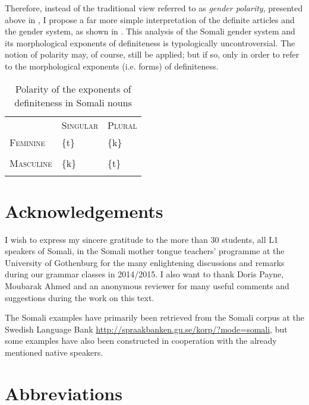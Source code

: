 \documentclass[output=paper]{langsci/langscibook}
\begin{document}
Therefore, instead of the traditional view referred to as \textit{gender polarity}, presented above in , I propose a far more simple interpretation of the definite articles and the gender system, as shown in . This analysis of the Somali gender system and its morphological exponents of definiteness is typologically uncontroversial. The notion of polarity may, of course, still be applied; but if so, only in order to refer to the morphological exponents (i.e. forms) of definiteness.


\begin{table}
\caption{Polarity of the exponents of definiteness in Somali nouns}
\label{tab:15}

\begin{tabularx}{\textwidth}{XXX} & \textsc{Singular}& \textsc{Plural}\\
\lsptoprule
 \textsc{Feminine}& \{t\}& \{k\}\\
\hhline{--~} &  & \\
\hhline{~~-}
 \textsc{Masculine}& \{k\}& \{t\}\\
\lspbottomrule
\end{tabularx}

\end{table} 

\section*{Acknowledgements}

I wish to express my sincere gratitude to the more than 30 students, all L1 speakers of Somali, in the Somali mother tongue teachers’ programme at the University of Gothenburg for the many enlightening discussions and remarks during our grammar classes in 2014/2015. I also want to thank Doris Payne, Moubarak Ahmed and an anonymous reviewer for many useful comments and suggestions during the work on this text.

The Somali examples have primarily been retrieved from the Somali corpus at the Swedish Language Bank \url{http://spraakbanken.gu.se/korp/?mode=somali}, but some examples have also been constructed in cooperation with the already mentioned native speakers.

\section*{Abbreviations}
\end{document}
